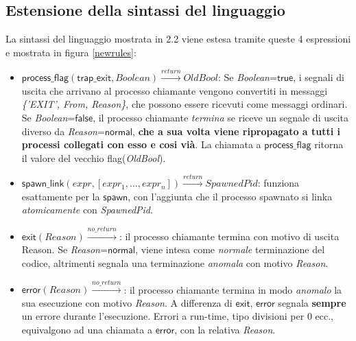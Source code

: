 \documentclass[Contributo.tex]{subfiles}
\begin{document}
\subsection{Estensione della sintassi del linguaggio}
La sintassi del linguaggio mostrata in 2.2 viene estesa tramite queste 4 espressioni e mostrata in figura \ref{newrules}:
\begin{itemize}
	\item $\displaystyle \mathsf{process\_flag}(\mathsf{trap\_exit},Boolean)\xrightarrow{return}OldBool$: Se \textit{Boolean}=$\mathsf{true}$, i segnali di uscita che arrivano al processo chiamante vengono convertiti in messaggi \textit{\{'EXIT', From, Reason\}}, che possono essere ricevuti come messaggi ordinari. 
	Se \textit{Boolean}=$\mathsf{false}$, il processo chiamante \textit{termina} se riceve un segnale di uscita diverso da \textit{Reason}=$\mathsf{normal}$, \textbf{che a sua volta viene ripropagato a tutti i processi collegati con esso e cosi vià}.
	La chiamata a $\mathsf{process\_flag}$ ritorna il valore del vecchio flag(\textit{OldBool}).
	\item $\displaystyle \mathsf{spawn\_link}(expr, [expr_{1},...,expr_{n}])\xrightarrow{return}SpawnedPid$: funziona esattamente per la $\mathsf{spawn}$, con l'aggiunta che il processo spawnato si linka \textit{atomicamente} con \textit{SpawnedPid}.
	\item $\displaystyle \mathsf{exit}(Reason)\xrightarrow{no\_return}$: il processo chiamante termina con motivo di uscita Reason.
	Se \textit{Reason}=$\mathsf{normal}$, viene intesa come \textit{normale} terminazione del codice, altrimenti segnala una terminazione \textit{anomala} con motivo \textit{Reason}.
	\item $\displaystyle \mathsf{error}(Reason)\xrightarrow{no\_return}$: il processo chiamante termina in modo \textit{anomalo} la sua esecuzione con motivo \textit{Reason}.
	A differenza di $\mathsf{exit}$, $\mathsf{error}$ segnala \textbf{sempre} un errore durante l'esecuzione.
	Errori a run-time, tipo divisioni per 0 ecc., equivalgono ad una chiamata a $\mathsf{error}$, con la relativa \textit{Reason}.
\end{itemize}
\end{document}
